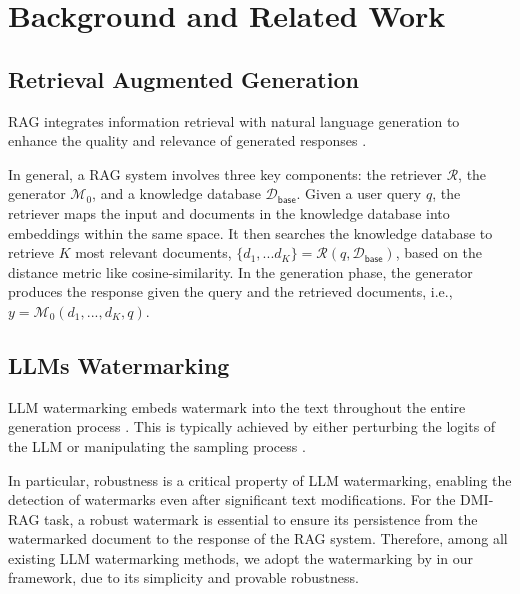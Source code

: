 \section{Background and Related Work}
\vspace{-0.2em}
\subsection{Retrieval Augmented Generation}
\vspace{-0.3em}
RAG \cite{karpukhin2020dense, xiong2020approximate, lewis2020retrieval} integrates information retrieval with natural language generation to enhance the quality and relevance of generated responses \cite{gao2023retrieval}. 


In general, a RAG system involves three key components: the retriever $\mathcal{R}$, the generator $\mathcal{M}_0$, and a knowledge database $\mathcal{D}_{\mathsf{base}}$. Given a user query $q$, the retriever maps the input and documents in the knowledge database into embeddings within the same space. It then searches the knowledge database to retrieve $K$ most relevant documents, $\{d_1,...d_K\}=\mathcal{R}(q, \mathcal{D}_{\mathsf{base}})$, based on the distance metric like cosine-similarity. In the generation phase, the generator produces the response given the query and the retrieved documents, i.e., $y=\mathcal{M}_0(d_1,...,d_K,q)$.

\vspace{-0.5em}

\subsection{LLMs Watermarking} 
\vspace{-0.5em}
LLM watermarking embeds watermark into the text throughout the entire generation process \cite{li2024statistical, he2024universally, li2024robust, zhao2024sok, zhao2024permute, fu2024gumbelsoft, giboulot2024watermax, wu2023dipmark, he2025dist}. This is typically achieved by either perturbing the logits of the LLM \cite{liu2024adaptive, kirchenbauer2023watermark, zhao2023provable} or manipulating the sampling process \cite{kuditipudi2023robust, christ2024undetectable}. 

In particular, robustness is a critical property of LLM watermarking, enabling the detection of watermarks even after significant text modifications. For the DMI-RAG task, a robust watermark is essential to ensure its persistence from the watermarked document to the response of the RAG system. Therefore, among all existing LLM watermarking methods, we adopt the watermarking by \citet{zhao2023provable} in our framework, due to its simplicity and provable robustness. 


